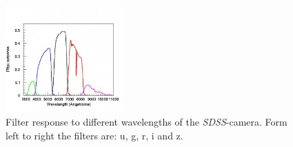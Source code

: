 \documentclass[%
 reprint,
 amsmath,amssymb,
 aps,
]{revtex4-2}
\begin{document}
 
 \begin{figure}[]
 	\centering
 	\includegraphics[width=0.4\textwidth]{figs/camera_filters-300x274.jpg}
 	\caption{ Filter response to different wavelengths of the \textit{SDSS}-camera. Form left to right the filters are: u, g, r, i and z. \cite{rgbSpec}
 		\label{fig:filterResp}
 	}
 \end{figure}
 
\end{document}
